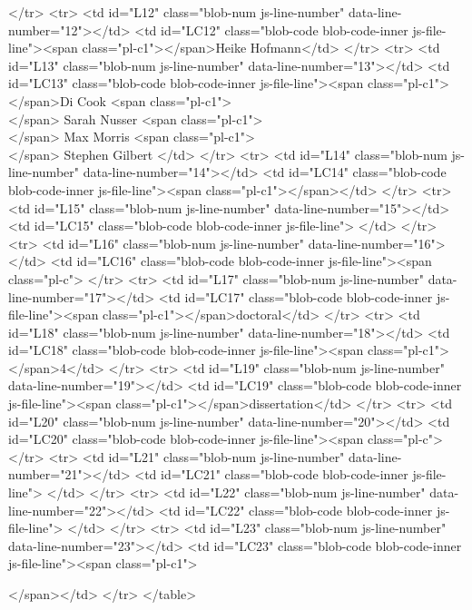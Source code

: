       </tr>
      <tr>
        <td id="L12" class="blob-num js-line-number" data-line-number="12"></td>
        <td id="LC12" class="blob-code blob-code-inner js-file-line"><span class="pl-c1">\mprof</span>{Heike Hofmann}</td>
      </tr>
      <tr>
        <td id="L13" class="blob-num js-line-number" data-line-number="13"></td>
        <td id="LC13" class="blob-code blob-code-inner js-file-line"><span class="pl-c1">\members</span>{Di Cook <span class="pl-c1">\\</span> Sarah Nusser <span class="pl-c1">\\</span> Max Morris <span class="pl-c1">\\</span> Stephen Gilbert }</td>
      </tr>
      <tr>
        <td id="L14" class="blob-num js-line-number" data-line-number="14"></td>
        <td id="LC14" class="blob-code blob-code-inner js-file-line"><span class="pl-c1">\notice</span></td>
      </tr>
      <tr>
        <td id="L15" class="blob-num js-line-number" data-line-number="15"></td>
        <td id="LC15" class="blob-code blob-code-inner js-file-line">
</td>
      </tr>
      <tr>
        <td id="L16" class="blob-num js-line-number" data-line-number="16"></td>
        <td id="LC16" class="blob-code blob-code-inner js-file-line"><span class="pl-c">%
      </tr>
      <tr>
        <td id="L17" class="blob-num js-line-number" data-line-number="17"></td>
        <td id="LC17" class="blob-code blob-code-inner js-file-line"><span class="pl-c1">\level</span>{doctoral}</td>
      </tr>
      <tr>
        <td id="L18" class="blob-num js-line-number" data-line-number="18"></td>
        <td id="LC18" class="blob-code blob-code-inner js-file-line"><span class="pl-c1">\committee</span>{4}</td>
      </tr>
      <tr>
        <td id="L19" class="blob-num js-line-number" data-line-number="19"></td>
        <td id="LC19" class="blob-code blob-code-inner js-file-line"><span class="pl-c1">\format</span>{dissertation}</td>
      </tr>
      <tr>
        <td id="L20" class="blob-num js-line-number" data-line-number="20"></td>
        <td id="LC20" class="blob-code blob-code-inner js-file-line"><span class="pl-c">%
      </tr>
      <tr>
        <td id="L21" class="blob-num js-line-number" data-line-number="21"></td>
        <td id="LC21" class="blob-code blob-code-inner js-file-line">
</td>
      </tr>
      <tr>
        <td id="L22" class="blob-num js-line-number" data-line-number="22"></td>
        <td id="LC22" class="blob-code blob-code-inner js-file-line">
</td>
      </tr>
      <tr>
        <td id="L23" class="blob-num js-line-number" data-line-number="23"></td>
        <td id="LC23" class="blob-code blob-code-inner js-file-line"><span class="pl-c1">\maketitle</span></td>
      </tr>
</table>

